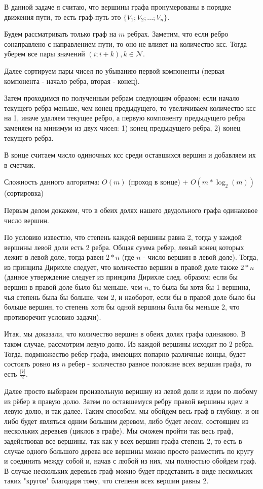 \documentclass[12pt]{extreport}
\theoremstyle{definition}
\theoremstyle{definition}
\begin{document}
\Pr \hspace{1mm} В данной задаче я считаю, что вершины графа пронумерованы в порядке движения пути, то есть граф-путь это $\{ V_1 ; V_2 ; ... ; V_n \}$.

Будем рассматривать только граф на $m$ ребрах. Заметим, что если ребро сонаправлено с направлением пути, то оно не влияет на количество ксс. Тогда уберем все пары значений $(i;i+k), k \in \mathcal{N}$. 

Далее сортируем пары чисел по убыванию первой компоненты (первая компонента - начало ребра, вторая - конец). 

Затем проходимся по полученным ребрам следующим образом: если начало текущего ребра меньше, чем конец предыдущего, то увеличиваем количество ксс на 1, иначе удаляем текущее ребро, а первую компоненту предыдущего ребра заменяем на минимум из двух чисел: 1) конец предыдущего ребра, 2) конец текущего ребра.

В конце считаем число одиночных ксс среди оставшихся вершин и добавляем их в счетчик.

Сложность данного алгоритма: $O(m)$ (проход в конце) + $O(m*\log_2(m))$ (сортировка)

\Pr \hspace{1mm} Первым делом докажем, что в обеих долях нашего двудольного графа одинаковое число вершин. 

По условию известно, что степень каждой вершины равна 2, тогда у каждой вершины левой доли есть 2 ребра. Общая сумма ребер, левый конец которых лежит в левой доле, тогда равен $2*n$ (где $n$ - число вершин в левой доле). Тогда, из принципа Дирихле следует, что количество вершин в правой доле также $2*n$ (данное утверждение следует из принципа Дирихле след. образом: если бы вершин в правой доле было бы меньше, чем $n$, то была бы хотя бы 1 вершина, чья степень была бы больше, чем 2, и наоборот, если бы в правой доле было бы больше вершин, то степень хотя бы одной вершины была бы меньше 2, что противоречит условию задачи).

Итак, мы доказали, что количество вершин в обеих долях графа одинаково. В таком случае, рассмотрим левую долю. Из каждой вершины исходит по 2 ребра. Тогда, подмножество ребер графа, имеющих попарно различные концы, будет состоять ровно из $n$ ребер - количество равное половине всех вершин графа, то есть $\frac{|V|}{2}$. 

Далее просто выбираем произвольную веришну из левой доли и идем по любому из рёбер в правую долю. Затем по оставшемуся ребру правой вершины идем в левую долю, и так далее. Таким способом, мы обойдем весь граф в глубину, и он либо будет являться одним большим деревом, либо будет лесом, состоящим из нескольких деревьев (циклов в графе). Мы сможем пройти так весь граф, задействовав все вершины, так как у всех вершин графа степень 2, то есть в случае одного большого дерева все вершины можно просто разместить по кругу и соединить между собой и, начав с любой из них, мы полностью обойдем граф. В случае нескольких деревьев граф можно будет представить в виде нескольких таких "кругов" благодаря тому, что степени всех вершин равны 2.
\end{document}
